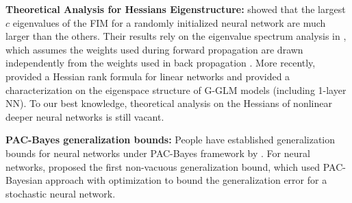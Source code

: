 \textbf{Theoretical Analysis for Hessians Eigenstructure:} \citet{karakida2019pathological} showed that the largest $c$ eigenvalues of the FIM for a randomly initialized neural network are much larger than the others. Their results rely on the eigenvalue spectrum analysis in \citet{karakida2019universal, karakida2019normalization}, which assumes the weights used during forward propagation are drawn independently from the weights used in back propagation \citep{schoenholz2016deep}. More recently, \citet{singh2021analytic} provided a Hessian rank formula for linear networks and \citet{liao2021hessian} provided a characterization on the eigenspace structure of G-GLM models (including 1-layer NN). To our best knowledge, theoretical analysis on the Hessians of nonlinear deeper neural networks is still vacant. %


\textbf{PAC-Bayes generalization bounds:} People have established generalization bounds for neural networks under PAC-Bayes framework by \citet{mcallester1999some}.
For neural networks, \citet{dziugaite2017computing} proposed the first non-vacuous generalization bound, which used PAC-Bayesian approach with optimization to bound the generalization error for a stochastic neural network.
